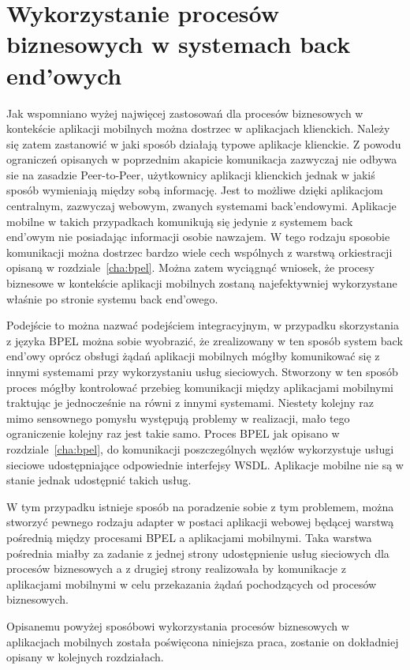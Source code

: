 
\section{Wykorzystanie procesów biznesowych w systemach back end'owych}
\label{sec:integracjaProcesówZAplikacjamiMobilnymi}
Jak wspomniano wyżej najwięcej zastosowań dla procesów biznesowych w kontekście aplikacji mobilnych można dostrzec w aplikacjach klienckich. Należy się zatem zastanowić w jaki sposób działają typowe aplikacje klienckie. Z powodu ograniczeń opisanych w poprzednim akapicie komunikacja zazwyczaj nie odbywa sie na zasadzie Peer-to-Peer, użytkownicy aplikacji klienckich jednak w jakiś sposób wymieniają między sobą informację. Jest to możliwe dzięki aplikacjom centralnym, zazwyczaj webowym, zwanych systemami back'endowymi. Aplikacje mobilne w takich przypadkach komunikują się jedynie z systemem back end'owym nie posiadając informacji osobie nawzajem. W tego rodzaju sposobie komunikacji można dostrzec bardzo wiele cech wspólnych z warstwą orkiestracji opisaną w rozdziale~\ref{cha:bpel}. Można zatem wyciągnąć wniosek, że procesy biznesowe w kontekście aplikacji mobilnych zostaną najefektywniej wykorzystane właśnie po stronie systemu back end'owego. 

Podejście to można nazwać podejściem integracyjnym, w przypadku skorzystania z języka BPEL można sobie wyobrazić, że zrealizowany w ten sposób system back end'owy oprócz obsługi żądań aplikacji mobilnych mógłby komunikować się z innymi systemami przy wykorzystaniu usług sieciowych. Stworzony w ten sposób proces mógłby kontrolować przebieg komunikacji między aplikacjami mobilnymi traktując je jednocześnie na równi z innymi systemami.  Niestety kolejny raz mimo sensownego pomysłu występują problemy w realizacji, mało tego ograniczenie kolejny raz jest takie samo. Proces BPEL jak opisano w rozdziale~\ref{cha:bpel}, do komunikacji poszczególnych węzłów wykorzystuje usługi sieciowe udostępniające odpowiednie interfejsy WSDL. Aplikacje mobilne nie są w stanie jednak udostępnić takich usług. 

W tym przypadku istnieje sposób na poradzenie sobie z tym problemem, można stworzyć pewnego rodzaju adapter w postaci aplikacji webowej będącej warstwą pośrednią między procesami BPEL a aplikacjami mobilnymi. Taka warstwa pośrednia miałby za zadanie z jednej strony udostępnienie usług sieciowych dla procesów biznesowych a z drugiej strony realizowała by komunikacje z aplikacjami mobilnymi w celu przekazania żądań pochodzących od procesów biznesowych. 

Opisanemu powyżej sposóbowi wykorzystania procesów biznesowych w aplikacjach mobilnych została poświęcona niniejsza praca, zostanie on dokładniej opisany w kolejnych rozdziałach.